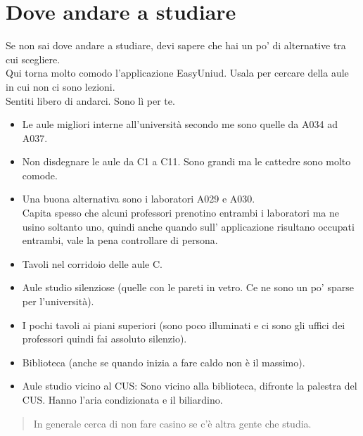 \documentclass{article}
\begin{document}
\section{Dove andare a studiare}
Se non sai dove andare a studiare, devi sapere che hai un po' di alternative tra cui scegliere.\\
Qui torna molto comodo l'applicazione EasyUniud. Usala per cercare della aule in cui non ci sono lezioni.\\
Sentiti libero di andarci. Sono lì per te.
\begin{itemize}
\item Le aule migliori interne all'università secondo me sono quelle da A034 ad A037.
\item Non disdegnare le aule da C1 a C11. Sono grandi ma le cattedre sono molto comode.
\item Una buona alternativa sono i laboratori A029 e A030.\\
	Capita spesso che alcuni professori prenotino entrambi i laboratori ma ne usino soltanto uno, quindi anche quando sull' applicazione risultano occupati entrambi, vale la pena controllare di persona.
\item Tavoli nel corridoio delle aule C.
\item Aule studio silenziose (quelle con le pareti in vetro. Ce ne sono un po' sparse per l'università).
\item I pochi tavoli ai piani superiori (sono poco illuminati e ci sono gli uffici dei professori quindi fai assoluto silenzio).
\item Biblioteca (anche se quando inizia a fare caldo non è il massimo).
\item Aule studio vicino al CUS: Sono vicino alla biblioteca, difronte la palestra del CUS. Hanno l'aria condizionata e il biliardino.
\end{itemize}
\begin{quote}
In generale cerca di non fare casino se c'è altra gente che studia.
\end{quote}
\end{document}
